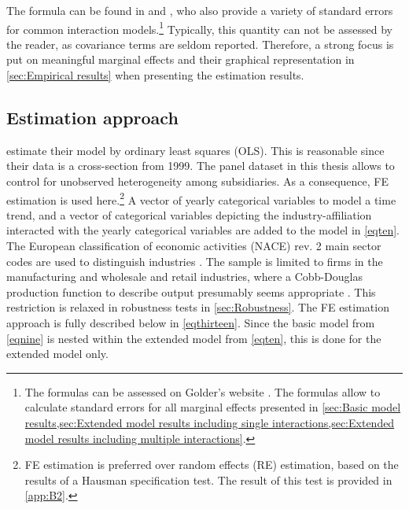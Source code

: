 \documentclass[10pt,twocolumn,oneside,cmyk]{article}
\begin{document}
The formula can be found in \textcite[70]{brambor_understanding_2006} and \textcite[16]{aiken_multiple_1991}, who also provide a variety of standard errors for common interaction models.\footnote{The formulas can be assessed on Golder's website \parencite{golder_interactions_2017}. The formulas allow to calculate standard errors for all marginal effects presented in \cref{sec:Basic model results,sec:Extended model results including single interactions,sec:Extended model results including multiple interactions}.} Typically, this quantity can not be assessed by the reader, as covariance terms are seldom reported. Therefore, a strong focus is put on meaningful marginal effects and their graphical representation in \cref{sec:Empirical results} when presenting the estimation results.

\subsection{Estimation approach} \label{sec:Estimation approach}
\textcite[1172-1173]{huizinga_international_2008} estimate their model by ordinary least squares (OLS). This is reasonable since their data is a cross-section from 1999. The panel dataset in this thesis allows to control for unobserved heterogeneity among subsidiaries. As a consequence, FE estimation is used here.\footnote{FE estimation is preferred over random effects (RE) estimation, based on the results of a Hausman specification test. The result of this test is provided in \cref{app:B2}.} A vector of yearly categorical variables to model a time trend, and a vector of categorical variables depicting the industry-affiliation interacted with the yearly categorical variables are added to the model in \cref{eqten}. The European classification of economic activities (NACE) rev. 2 main sector codes are used to distinguish industries \parencite[57]{european_commission_nace_2008}. The sample is limited to firms in the manufacturing and wholesale and retail industries, where a Cobb-Douglas production function to describe output presumably seems appropriate \parencite[for example][1172]{huizinga_international_2008}. This restriction is relaxed in robustness tests in \cref{sec:Robustness}. The FE estimation approach is fully described below in \cref{eqthirteen}. Since the basic model from \cref{eqnine} is nested within the extended model from \cref{eqten}, this is done for the extended model only.
\end{document}
